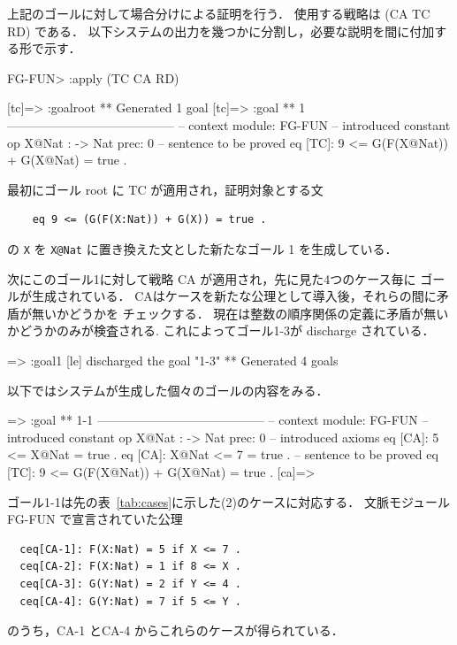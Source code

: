\documentclass[a4paper,oneside,10pt,here]{memoir}
\newenvironment{vvtm}%
{\parskip=0pt\lineskip=0pt\begin{center}\begin{minipage}{0.8\textwidth}\begin{snugshade}}%
  {\end{snugshade}\end{minipage}\end{center}}
\begin{document}
上記のゴールに対して場合分けによる証明を行う．
使用する戦略は (CA TC RD) である．
以下システムの出力を幾つかに分割し，必要な説明を間に付加する形で示す．

\begin{vvtm}
  \begin{simplev}
FG-FUN> :apply (TC CA RD)

[tc]=> :goal{root}
** Generated 1 goal
[tc]=>
:goal { ** 1 -----------------------------------------
  -- context module: FG-FUN
  -- introduced constant
    op X@Nat : -> Nat { prec: 0 }
  -- sentence to be proved
    eq [TC]: 9 <= G(F(X@Nat)) + G(X@Nat)
        = true .
}
\end{simplev}
\end{vvtm}
最初にゴール root に TC が適用され，証明対象とする文
\begin{verbatim}
    eq 9 <= (G(F(X:Nat)) + G(X)) = true .
\end{verbatim}
の \texttt{X} を \verb|X@Nat| に置き換えた文とした新たなゴール 1 を生成している．

次にこのゴール1に対して戦略 CA が適用され，先に見た4つのケース毎に
ゴールが生成されている．
CAはケースを新たな公理として導入後，それらの間に矛盾が無いかどうかを
チェックする．
現在は整数の順序関係の定義に矛盾が無いかどうかのみが検査される.
これによってゴール1-3が discharge されている．

\begin{vvtm}
\begin{simplev}
[ca]=> :goal{1}
[le] discharged the goal "1-3"
** Generated 4 goals
\end{simplev}
\end{vvtm}

以下ではシステムが生成した個々のゴールの内容をみる．

\begin{vvtm}
\begin{simplev}
[ca]=>
:goal { ** 1-1 -----------------------------------------
  -- context module: FG-FUN
  -- introduced constant
    op X@Nat : -> Nat { prec: 0 }
  -- introduced axioms
    eq [CA]: 5 <= X@Nat = true .
    eq [CA]: X@Nat <= 7 = true .
  -- sentence to be proved
    eq [TC]: 9 <= G(F(X@Nat)) + G(X@Nat)
        = true .
}
[ca]=>
\end{simplev}
\end{vvtm}
ゴール1-1は先の表~\ref{tab:cases}に示した(2)のケースに対応する．
文脈モジュール FG-FUN で宣言されていた公理
\begin{verbatim}
  ceq[CA-1]: F(X:Nat) = 5 if X <= 7 .
  ceq[CA-2]: F(X:Nat) = 1 if 8 <= X .
  ceq[CA-3]: G(Y:Nat) = 2 if Y <= 4 .
  ceq[CA-4]: G(Y:Nat) = 7 if 5 <= Y .
\end{verbatim}
のうち，CA-1 とCA-4 からこれらのケースが得られている．
\end{document}
